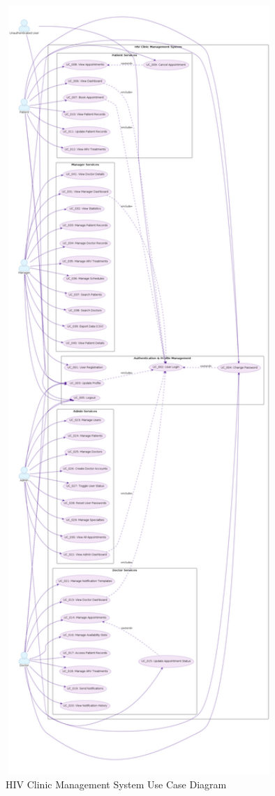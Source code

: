 \documentclass[12pt,a4paper]{article}
\begin{document}
\begin{figure}[H]
\centering
\includegraphics[width=0.9\textwidth]{diagrams/use_case_diagram.png}
\caption{HIV Clinic Management System Use Case Diagram}
\label{fig:use-case-diagram}
\end{figure}
\end{document}

